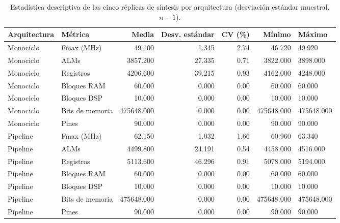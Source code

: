 \begin{table}[htbp]
\centering
\caption{Estadística descriptiva de las cinco réplicas de síntesis por arquitectura (desviación estándar muestral, $n-1$).}
\label{tab:statistics}
\begin{tabular}{llrrrr}
\toprule
Arquitectura & Métrica & Media & Desv. estándar & CV (\%) & Mínimo & Máximo \\
\midrule
Monociclo & Fmax (MHz) & 49.100 & 1.345 & 2.74 & 46.720 & 49.920 \\
Monociclo & ALMs & 3857.200 & 27.335 & 0.71 & 3822.000 & 3898.000 \\
Monociclo & Registros & 4206.600 & 39.215 & 0.93 & 4162.000 & 4248.000 \\
Monociclo & Bloques RAM & 60.000 & 0.000 & 0.00 & 60.000 & 60.000 \\
Monociclo & Bloques DSP & 10.000 & 0.000 & 0.00 & 10.000 & 10.000 \\
Monociclo & Bits de memoria & 475648.000 & 0.000 & 0.00 & 475648.000 & 475648.000 \\
Monociclo & Pines & 90.000 & 0.000 & 0.00 & 90.000 & 90.000 \\
Pipeline & Fmax (MHz) & 62.150 & 1.032 & 1.66 & 60.960 & 63.340 \\
Pipeline & ALMs & 4499.800 & 24.191 & 0.54 & 4458.000 & 4516.000 \\
Pipeline & Registros & 5113.600 & 46.296 & 0.91 & 5078.000 & 5194.000 \\
Pipeline & Bloques RAM & 60.000 & 0.000 & 0.00 & 60.000 & 60.000 \\
Pipeline & Bloques DSP & 10.000 & 0.000 & 0.00 & 10.000 & 10.000 \\
Pipeline & Bits de memoria & 475648.000 & 0.000 & 0.00 & 475648.000 & 475648.000 \\
Pipeline & Pines & 90.000 & 0.000 & 0.00 & 90.000 & 90.000 \\
\bottomrule
\end{tabular}
\end{table}

